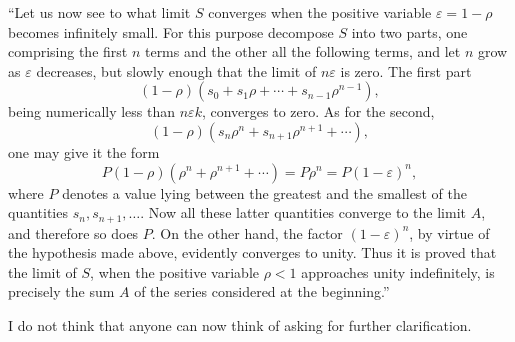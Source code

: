 \documentclass[11pt]{article}
\begin{document}
``Let us now see to what limit \(S\) converges when the positive variable \(\varepsilon=1-\rho\) becomes infinitely small. For this purpose decompose \(S\) into two parts, one comprising the first \(n\) terms and the other all the following terms, and let \(n\) grow as \(\varepsilon\) decreases, but slowly enough that the limit of \(n\varepsilon\) is zero. The first part
\[
(1-\rho)(s_0+s_1\rho+\cdots+s_{n-1}\rho^{n-1}),
\]
being numerically less than \(n\varepsilon k\), converges to zero. As for the second,
\[
(1-\rho)(s_n\rho^n+s_{n+1}\rho^{n+1}+\cdots),
\]
one may give it the form
\[
P(1-\rho)(\rho^n+\rho^{n+1}+\cdots)=P\rho^n=P(1-\varepsilon)^n,
\]
where \(P\) denotes a value lying between the greatest and the smallest of the quantities \(s_n, s_{n+1},\ldots\). Now all these latter quantities converge to the limit \(A\), and therefore so does \(P\). On the other hand, the factor \((1-\varepsilon)^n\), by virtue of the hypothesis made above, evidently converges to unity. Thus it is proved that the limit of \(S\), when the positive variable \(\rho<1\) approaches unity indefinitely, is precisely the sum \(A\) of the series considered at the beginning.''

I do not think that anyone can now think of asking for further clarification.
\end{document}
